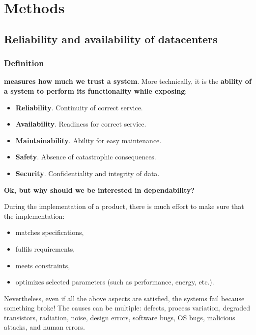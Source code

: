 \section{Methods}

\subsection{Reliability and availability of datacenters}

\subsubsection{Definition}

 \textbf{measures how much we trust a system}. More technically, it is the \textbf{ability of a system to perform its functionality while exposing}:
\begin{itemize}
    \item \textbf{Reliability}. Continuity of correct service.
    \item \textbf{Availability}. Readiness for correct service.
    \item \textbf{Maintainability}. Ability for easy maintenance.
    \item \textbf{Safety}. Absence of catastrophic consequences.
    \item \textbf{Security}. Confidentiality and integrity of data.
\end{itemize}

\begin{flushleft}
    \textcolor{Green3}{ \textbf{Ok, but why should we be interested in dependability?}}
\end{flushleft}
During the implementation of a product, there is much effort to make sure that the implementation:
\begin{itemize}
    \item matches specifications,
    \item fulfils requirements,
    \item meets constraints,
    \item optimizes selected parameters (such as performance, energy, etc.).
\end{itemize}
Nevertheless, even if all the above aspects are satisfied, the systems fail because something broke! The causes can be multiple: defects, process variation, degraded transistors, radiation, noise, design errors, software bugs, OS bugs, malicious attacks, and human errors.

